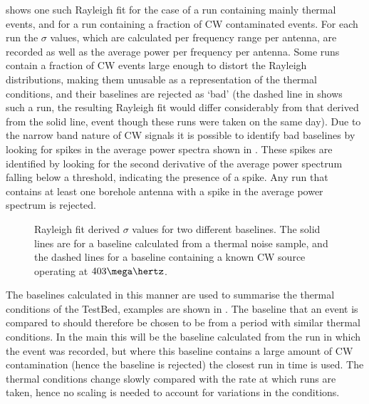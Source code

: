 shows one such Rayleigh fit for the case of a run containing mainly thermal events, and for a run containing a fraction of CW contaminated events. For each run the $\sigma$ values, which are calculated per frequency range per antenna, are recorded as well as the average power per frequency per antenna. Some runs contain a fraction of CW events large enough to distort the Rayleigh distributions, making them unusable as a representation of the thermal conditions, and their baselines are rejected as `bad' (the dashed line in  shows such a run, the resulting Rayleigh fit would differ considerably from that derived from the solid line, event though these runs were taken on the same day). Due to the narrow band nature of CW signals it is possible to identify bad baselines by looking for spikes in the average power spectra shown in . These spikes are identified by looking for the second derivative of the average power spectrum falling below a threshold, indicating the presence of a spike. Any run that contains at least one borehole antenna with a spike in the average power spectrum is rejected. 

\begin{figure}[htpb]
  \hfill
  \caption{Rayleigh fit derived $\sigma$ values for two different baselines. The solid lines are for a baseline calculated from a thermal noise sample, and the dashed lines for a baseline containing a known CW source operating at $403 \mega \hertz$.} 
  \label{fig:analysis:CWRemoval:Baselines:Rayleigh-Sigma}
\end{figure}

The baselines calculated in this manner are used to summarise the thermal conditions of the TestBed, examples are shown in . The baseline that an event is compared to should therefore be chosen to be from a period with similar thermal conditions. In the main this will be the baseline calculated from the run in which the event was recorded, but where this baseline contains a large amount of CW contamination (hence the baseline is rejected) the closest run in time is used. The thermal conditions change slowly compared with the rate at which runs are taken, hence no scaling is needed to account for variations in the conditions.

